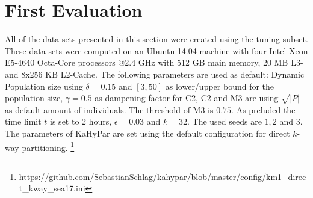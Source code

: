 \documentclass[a4paper,12pt,titlepage, BCOR7mm,headsepline]{scrbook}
\numberwithin{equation}{section}
\begin{document}
\section{First Evaluation} 
All of the data sets presented in this section were created using the tuning subset. These data sets were computed on an Ubuntu 14.04 machine with four Intel Xeon E5-4640 Octa-Core processors @2.4 GHz with 512 GB main memory, 20 MB L3- and 8x256 KB L2-Cache. The following parameters are used as default: Dynamic Population size using $\delta = 0.15$ and $[3,50]$ as lower/upper bound for the population size, $\gamma = 0.5$ as dampening factor for C2, C2 and M3 are using $\sqrt{|P|}$ as default amount of individuals. The threshold of M3 is $0.75$. As preluded the time limit $t$ is set to 2 hours, $\epsilon = 0.03$ and $k=32$. The used seeds are $1,2$ and $3$. The parameters of KaHyPar are set using the default configuration for direct $k$-way partitioning. \footnote{https://github.com/SebastianSchlag/kahypar/blob/master/config/km1\_direct\_kway\_sea17.ini}
\end{document}

